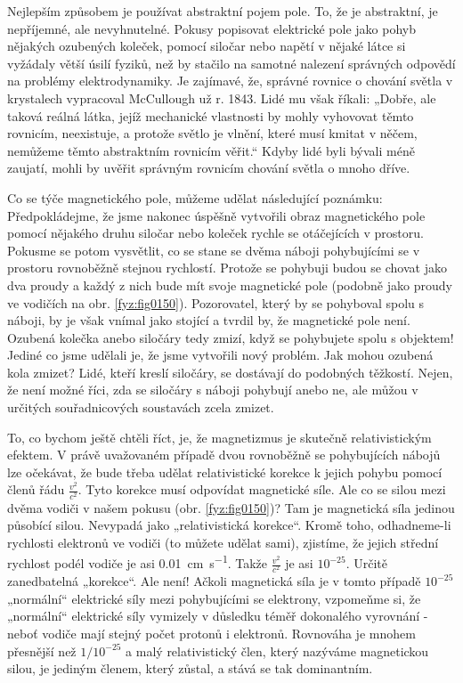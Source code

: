     Nejlepším způsobem je používat abstraktní pojem pole. To, že je abstraktní, je nepříjemné, ale  
    nevyhnutelné. Pokusy popisovat elektrické pole jako pohyb nějakých ozubených koleček, pomocí 
    siločar nebo napětí v nějaké látce si vyžádaly větší úsilí fyziků, než by stačilo na samotné 
    nalezení správných odpovědí na problémy elektrodynamiky. Je zajímavé, že, správné rovnice o 
    chování světla v krystalech vypracoval McCullough už r. 1843. Lidé mu však říkali: „Dobře, ale 
    taková reálná látka, jejíž mechanické vlastnosti by mohly vyhovovat těmto rovnicím, neexistuje, 
    a protože světlo je vlnění, které musí kmitat v něčem, nemůžeme těmto abstraktním rovnicím 
    věřit.“ Kdyby lidé byli bývali méně zaujatí, mohli by uvěřit správným rovnicím chování světla o 
    mnoho dříve.
    
    Co se týče magnetického pole, můžeme udělat následující poznámku: Předpokládejme, že jsme 
    nakonec úspěšně vytvořili obraz magnetického pole pomocí nějakého druhu siločar nebo koleček 
    rychle se otáčejících v prostoru. Pokusme se potom vysvětlit, co se stane se dvěma náboji 
    pohybujícími se v prostoru rovnoběžně stejnou rychlostí. Protože se pohybuji budou se chovat 
    jako dva proudy a každý z nich bude mít svoje magnetické pole (podobně jako proudy ve vodičích 
    na obr. \ref{fyz:fig0150}). Pozorovatel, který by se pohyboval spolu s náboji, by je 
    však vnímal jako stojící a tvrdil by, že magnetické pole není. Ozubená kolečka anebo siločáry 
    tedy zmizí, když se pohybujete spolu s objektem! Jediné co jsme udělali je, že jsme vytvořili 
    nový problém. Jak mohou ozubená kola zmizet? Lidé, kteří kreslí siločáry, se dostávají do 
    podobných těžkostí. Nejen, že není možné říci, zda se siločáry s náboji pohybují anebo ne, ale 
    můžou v určitých souřadnicových soustavách zcela zmizet.
    
    To, co bychom ještě chtěli říct, je, že magnetizmus je skutečně relativistickým efektem. V právě
    uvažovaném případě dvou rovnoběžně se pohybujících nábojů lze očekávat, že bude třeba udělat  
    relativistické korekce k jejich pohybu pomocí členů řádu \(\frac{v^2}{c^2}\). Tyto korekce musí 
    odpovídat magnetické síle. Ale co se silou mezi dvěma vodiči v našem pokusu (obr. 
    \ref{fyz:fig0150})? Tam je magnetická síla jedinou působící silou. Nevypadá jako 
    „relativistická korekce“. Kromě toho, odhadneme-li rychlosti elektronů ve vodiči (to můžete 
    udělat sami), zjistíme, že jejich střední rychlost podél vodiče je asi 
    \SI{0,01}{\centi\metre\per\second}. Takže \(\frac{v^2}{c^2}\) je asi \(10^{-25}\). Určitě 
    zanedbatelná „korekce“. Ale není! Ačkoli magnetická síla je v tomto případě \(10^{-25}\) 
    „normální“ elektrické síly mezi pohybujícími se elektrony, vzpomeňme si, že „normální“ 
    elektrické síly vymizely v důsledku téměř dokonalého vyrovnání - neboť vodiče mají stejný počet 
    protonů i elektronů. Rovnováha je mnohem přesnější než \(1/10^{-25}\) a malý relativistický 
    člen, který nazýváme magnetickou silou, je jediným členem, který zůstal, a stává se tak 
    dominantním.
    
